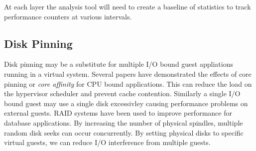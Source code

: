 \indent At each layer the analysis tool will need to create a baseline of statistics to track performance counters at various intervals.

\subsection{Disk Pinning}
Disk pinning may be a substitute for multiple I/O bound guest appliations running in a virtual system.  Several papers have demonstrated the effects of core pinning or \emph{core affinity} for CPU bound applications.  This can reduce the load on the hypervisor scheduler and prevent cache contention.  Similarly a single I/O bound guest may use a single disk excessivley causing performance problems on external guests.  RAID systems have been used to improve performance for database applications.  By increasing the number of physical spindles, multiple random disk seeks can occur concurrently.  By setting physical disks to specific virtual guests, we can reduce I/O interference from multiple guests.

